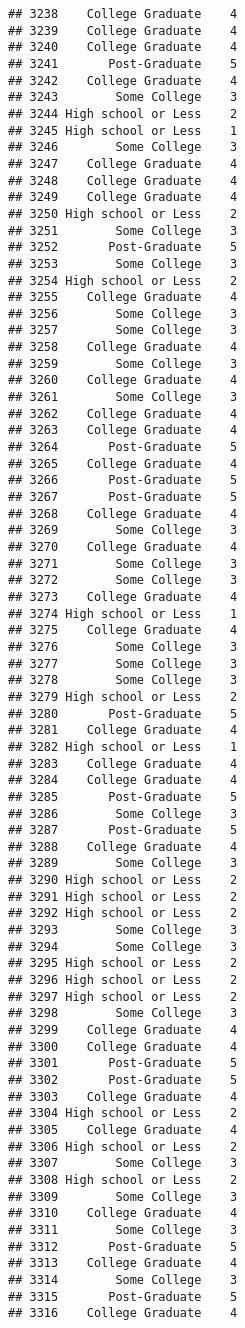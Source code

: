 \documentclass[
]{article}
\begin{document}
\begin{verbatim}
## 3238    College Graduate    4
## 3239    College Graduate    4
## 3240    College Graduate    4
## 3241       Post-Graduate    5
## 3242    College Graduate    4
## 3243        Some College    3
## 3244 High school or Less    2
## 3245 High school or Less    1
## 3246        Some College    3
## 3247    College Graduate    4
## 3248    College Graduate    4
## 3249    College Graduate    4
## 3250 High school or Less    2
## 3251        Some College    3
## 3252       Post-Graduate    5
## 3253        Some College    3
## 3254 High school or Less    2
## 3255    College Graduate    4
## 3256        Some College    3
## 3257        Some College    3
## 3258    College Graduate    4
## 3259        Some College    3
## 3260    College Graduate    4
## 3261        Some College    3
## 3262    College Graduate    4
## 3263    College Graduate    4
## 3264       Post-Graduate    5
## 3265    College Graduate    4
## 3266       Post-Graduate    5
## 3267       Post-Graduate    5
## 3268    College Graduate    4
## 3269        Some College    3
## 3270    College Graduate    4
## 3271        Some College    3
## 3272        Some College    3
## 3273    College Graduate    4
## 3274 High school or Less    1
## 3275    College Graduate    4
## 3276        Some College    3
## 3277        Some College    3
## 3278        Some College    3
## 3279 High school or Less    2
## 3280       Post-Graduate    5
## 3281    College Graduate    4
## 3282 High school or Less    1
## 3283    College Graduate    4
## 3284    College Graduate    4
## 3285       Post-Graduate    5
## 3286        Some College    3
## 3287       Post-Graduate    5
## 3288    College Graduate    4
## 3289        Some College    3
## 3290 High school or Less    2
## 3291 High school or Less    2
## 3292 High school or Less    2
## 3293        Some College    3
## 3294        Some College    3
## 3295 High school or Less    2
## 3296 High school or Less    2
## 3297 High school or Less    2
## 3298        Some College    3
## 3299    College Graduate    4
## 3300    College Graduate    4
## 3301       Post-Graduate    5
## 3302       Post-Graduate    5
## 3303    College Graduate    4
## 3304 High school or Less    2
## 3305    College Graduate    4
## 3306 High school or Less    2
## 3307        Some College    3
## 3308 High school or Less    2
## 3309        Some College    3
## 3310    College Graduate    4
## 3311        Some College    3
## 3312       Post-Graduate    5
## 3313    College Graduate    4
## 3314        Some College    3
## 3315       Post-Graduate    5
## 3316    College Graduate    4

\end{verbatim}
\end{document}
